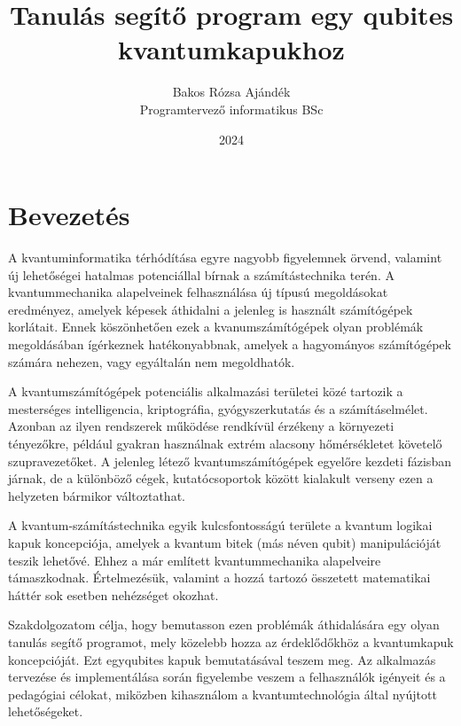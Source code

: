 \documentclass[
]{thesis-ekf}
\theoremstyle{definition}
\theoremstyle{remark}
\begin{document}
\title{Tanulás segítő program egy qubites kvantumkapukhoz}
\author{Bakos Rózsa Ajándék\\Programtervező informatikus BSc}
\date{2024}
\maketitle
\tableofcontents

\chapter*{Bevezetés}
A kvantuminformatika térhódítása egyre nagyobb figyelemnek örvend, valamint új lehetőségei hatalmas potenciállal bírnak a számítástechnika terén. A kvantummechanika alapelveinek felhasználása új típusú megoldásokat eredményez, amelyek képesek áthidalni a jelenleg is használt számítógépek korlátait. Ennek köszönhetően ezek a kvanumszámítógépek olyan problémák megoldásában ígérkeznek hatékonyabbnak, amelyek a hagyományos számítógépek számára nehezen, vagy egyáltalán nem megoldhatók.

A kvantumszámítógépek potenciális alkalmazási területei közé tartozik a mesterséges intelligencia, kriptográfia, gyógyszerkutatás és a számításelmélet. Azonban az ilyen rendszerek működése rendkívül érzékeny a környezeti tényezőkre, például gyakran használnak extrém alacsony hőmérsékletet követelő szupravezetőket. A jelenleg létező kvantumszámítógépek egyelőre kezdeti fázisban járnak, de a különböző cégek, kutatócsoportok között kialakult verseny ezen a helyzeten bármikor változtathat.

A kvantum-számítástechnika egyik kulcsfontosságú területe a kvantum logikai kapuk koncepciója, amelyek a kvantum bitek (más néven qubit) manipulációját teszik lehetővé. Ehhez a már említett kvantummechanika alapelveire támaszkodnak. Értelmezésük, valamint a hozzá tartozó összetett matematikai háttér sok esetben nehézséget okozhat.

Szakdolgozatom célja, hogy bemutasson ezen problémák áthidalására egy olyan tanulás segítő programot, mely közelebb hozza az érdeklődőkhöz a kvantumkapuk koncepcióját. Ezt egyqubites kapuk bemutatásával teszem meg. Az alkalmazás tervezése és implementálása során figyelembe veszem a felhasználók igényeit és a pedagógiai célokat, miközben kihasználom a kvantumtechnológia által nyújtott lehetőségeket.
\end{document}

